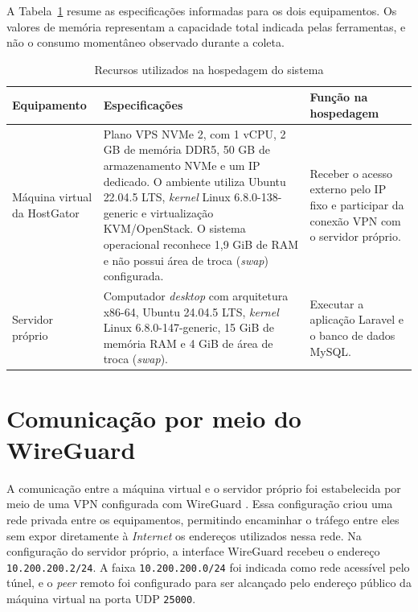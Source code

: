 A Tabela~\ref{tab:recursos-hospedagem} resume as especificações informadas para os dois equipamentos. Os valores de memória representam a capacidade total indicada pelas ferramentas, e não o consumo momentâneo observado durante a coleta.

\begin{table}[htbp]
\centering
\caption{Recursos utilizados na hospedagem do sistema}
\label{tab:recursos-hospedagem}
\small
\begin{tabularx}{\textwidth}{p{3.1cm} X X}
\hline
\textbf{Equipamento} & \textbf{Especificações} & \textbf{Função na hospedagem} \\
\hline
Máquina virtual da HostGator & Plano VPS NVMe 2, com 1 vCPU, 2 GB de memória DDR5, 50 GB de armazenamento NVMe e um IP dedicado. O ambiente utiliza Ubuntu 22.04.5 LTS, \textit{kernel} Linux 6.8.0-138-generic e virtualização KVM/OpenStack. O sistema operacional reconhece 1,9 GiB de RAM e não possui área de troca (\textit{swap}) configurada. & Receber o acesso externo pelo IP fixo e participar da conexão VPN com o servidor próprio. \\
\hline
Servidor próprio & Computador \textit{desktop} com arquitetura x86-64, Ubuntu 24.04.5 LTS, \textit{kernel} Linux 6.8.0-147-generic, 15 GiB de memória RAM e 4 GiB de área de troca (\textit{swap}). & Executar a aplicação Laravel e o banco de dados MySQL. \\
\hline
\end{tabularx}
\end{table}

\section{Comunicação por meio do WireGuard}

A comunicação entre a máquina virtual e o servidor próprio foi estabelecida por meio de uma VPN configurada com WireGuard \cite{donenfeld2017wireguard}. Essa configuração criou uma rede privada entre os equipamentos, permitindo encaminhar o tráfego entre eles sem expor diretamente à \textit{Internet} os endereços utilizados nessa rede. Na configuração do servidor próprio, a interface WireGuard recebeu o endereço \texttt{10.200.200.2/24}. A faixa \texttt{10.200.200.0/24} foi indicada como rede acessível pelo túnel, e o \textit{peer} remoto foi configurado para ser alcançado pelo endereço público da máquina virtual na porta UDP \texttt{25000}.

